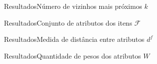 \begin{frame}{Resultados}{Número de vizinhos mais próximos $k$}
\end{frame}

\begin{frame}{Resultados}{Conjunto de atributos dos itens  $\mathcal{F}$}
\end{frame}

\begin{frame}{Resultados}{Medida de distância entre atributos $d^f$}
\end{frame}


\begin{frame}{Resultados}{Quantidade de pesos dos atributos $W$}
\end{frame}